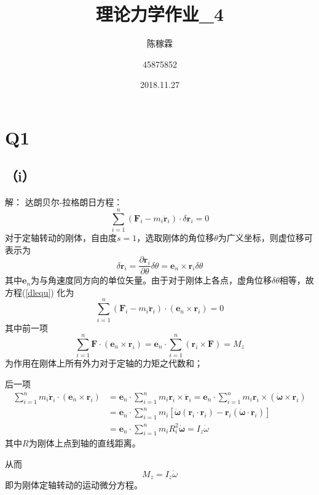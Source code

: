 \documentclass[10pt,a4paper]{article}
\title{理论力学作业\_4}
\author{陈稼霖 \and 45875852}
\date{2018.11.27}
\begin{document}
\maketitle
\section*{Q1}
\subsection*{（i）}解：
达朗贝尔-拉格朗日方程：
\begin{equation}
\label{dlequ}
\sum_{i=1}^n(\bm{F}_i-m_i\ddot{\bm{r}}_i)\cdot\delta\bm{r}_i = 0
\end{equation}
对于定轴转动的刚体，自由度$s=1$，选取刚体的角位移$\theta$为广义坐标，则虚位移可表示为
\[
\delta\bm{r}_i = \frac{\partial\bm{r}_i}{\partial\theta}\delta\theta = \bm{e}_n\times\bm{r}_i\delta\theta
\]
其中$\bm{e}_n$为与角速度同方向的单位矢量。由于对于刚体上各点，虚角位移$\delta\theta$相等，故方程(\ref{dlequ}) 化为
\[
\sum_{i=1}^n(\bm{F}_i-m_i\ddot{\bm{r}}_i)\cdot(\bm{e}_n\times\bm{r}_i) = 0
\]
其中前一项
\[
\sum_{i=1}^n\bm{F}\cdot(\bm{e}_n\times\bm{r}_i) = \bm{e}_n\cdot\sum_{i=1}^n(\bm{r}_i\times\bm{F}) = M_z
\]
为作用在刚体上所有外力对于定轴的力矩之代数和；

\noindent 后一项
\begin{align*}
\sum_{i=1}^nm_i\ddot{\bm{r}}_i\cdot(\bm{e}_n\times\bm{r}_i) &= \bm{e}_n\cdot\sum_{i=1}^nm_i\bm{r}_i\times\ddot{\bm{r}}_i = \bm{e}_n\cdot\sum_{i=1}^nm_i\bm{r}_i\times(\dot{\bm{\omega}}\times\bm{r}_i)\\
&= \bm{e}_n\cdot\sum_{i=1}^nm_i[\dot{\bm{\omega}}(\bm{r}_i\cdot\bm{r}_i)-\bm{r}_i(\dot{\bm{\omega}}\cdot\bm{r}_i)]\\
&= \bm{e}_n\cdot\sum_{i=1}^nm_iR_i^2\dot{\bm{\omega}} = I_z\dot{\omega}
\end{align*}
其中$R$为刚体上点到轴的直线距离。

\noindent 从而
\[
M_z = I_z\dot{\omega}
\]
即为刚体定轴转动的运动微分方程。
\end{document}
